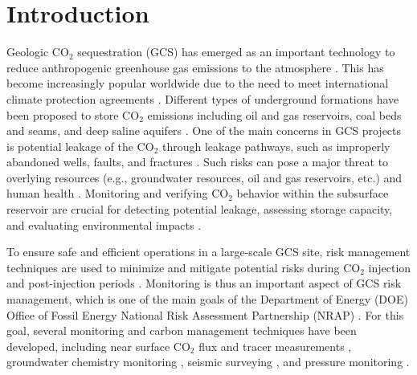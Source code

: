 \documentclass[a4paper,fleqn]{cas-sc}
\begin{document}
\section{Introduction}
Geologic CO$_2$ sequestration (GCS) has emerged as an important technology to reduce anthropogenic greenhouse gas emissions to the atmosphere \citep{Metz2005,Michael2010,Kopp2010867, Goodman2013329, Castelletto2013570, Li2015389, Levine201681, krevorCCS2018}. This has become increasingly popular worldwide due to the need to meet international climate protection agreements \citep{Energy20202010EuropeanCommission, Unitednations2015AgreementP}. Different types of underground formations have been proposed to store CO$_2$ emissions including oil and gas reservoirs, coal beds and seams, and deep saline aquifers \citep{Dai2016CO2Sites}. One of the main concerns in GCS projects is potential leakage of the CO$_2$ through leakage pathways, such as improperly abandoned wells, faults, and fractures \citep{Metz2005, Harp2016150, Song2012, Sifuentes2009148, Nordbotten2012234}. Such risks can pose a major threat to overlying resources (e.g., groundwater resources, oil and gas reservoirs, etc.) and human health \citep{Benson2003, Keating2016319}. Monitoring and verifying CO$_2$ behavior within the subsurface reservoir are crucial for detecting potential leakage, assessing storage capacity, and evaluating environmental impacts \citep{Condor20114036, DeLary201550, Li2016249}.

To ensure safe and efficient operations in a large-scale GCS site, risk management techniques are used to minimize and mitigate potential risks during CO$_2$ injection and post-injection periods \citep{Nicot2013388, Onishi201944, Dai20143908, Zhang20111631, Chadwick20051385}. Monitoring is thus an important aspect of GCS risk management, which is one of the main goals of the Department of Energy (DOE) Office of Fossil Energy National Risk Assessment Partnership (NRAP) \citep{Pawar2016175}. For this goal, several monitoring and carbon management techniques have been developed, including near surface CO$_2$ flux and tracer measurements \citep{Yang2012185, Ren2016108}, groundwater chemistry monitoring \citep{Dai2014, Yang20158887}, seismic surveying \citep{Ren2016108, Zhang20151, Chadwick2006303, Grana2017296}, and pressure monitoring \citep{Keating20144163, Wang2014188, Azzolina2014895, Oruganti20114140, Senel20134598}. 
\end{document}
